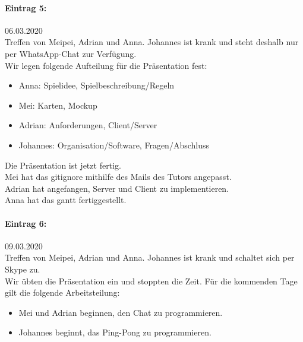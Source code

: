 \documentclass[12pt]{article}
\begin{document}
\paragraph{Eintrag 5:}
06.03.2020\\
Treffen von Meipei, Adrian und Anna. Johannes ist krank und steht deshalb nur per WhatsApp-Chat zur Verf\"ugung.\\
Wir legen folgende Aufteilung für die Pr\"asentation fest:
\begin{itemize}
\item Anna: Spielidee, Spielbeschreibung/Regeln
\item Mei: Karten, Mockup
\item Adrian: Anforderungen, Client/Server
\item Johannes: Organisation/Software, Fragen/Abschluss
\end{itemize}

\noindent Die Pr\"asentation  ist jetzt fertig.\\
Mei hat das gitignore mithilfe des Mails des Tutors angepasst.\\
Adrian hat angefangen, Server und Client zu implementieren.\\ 
Anna hat das gantt fertiggestellt.

\paragraph{Eintrag 6:}
09.03.2020\\
Treffen von Meipei, Adrian und Anna. Johannes ist krank und schaltet sich per Skype zu.\\
Wir übten die Pr\"asentation ein und stoppten die Zeit. Für die kommenden Tage gilt die folgende Arbeitsteilung:
\begin{itemize} 
\item Mei und Adrian beginnen, den Chat zu programmieren.
\item Johannes beginnt, das Ping-Pong zu programmieren.
\end{itemize}
\end{document}
